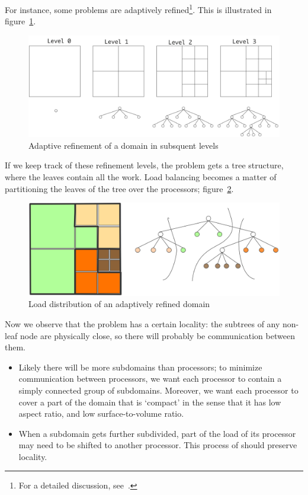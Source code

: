 For instance, some problems are adaptively
refined\footnote{For a detailed
  discussion, see~\cite{Campbell:octree}.}. This is illustrated in
figure~\ref{fig:octree1}.
\begin{figure}[ht]
  \includegraphics[scale=.14]{graphics/my_octree1}
  \caption{Adaptive refinement of a domain in subsquent levels}
  \label{fig:octree1}
\end{figure}
If we keep track of these refinement levels, the problem gets a tree
structure, where the leaves contain all the work.
Load balancing becomes a matter of partitioning the leaves of the
tree over the processors; figure~\ref{fig:octree2}.
\begin{figure}[ht]
  \includegraphics[scale=.18]{graphics/my_octree2}
  \caption{Load distribution of an adaptively refined domain}
  \label{fig:octree2}
\end{figure}
Now we observe that the problem has a certain locality: the subtrees
of any non-leaf node are physically close, so there will probably be
communication between them. 
\begin{itemize}
\item Likely there will be more subdomains than processors; to
  minimize communication between processors, we want each processor to
  contain a simply connected group of subdomains. Moreover, we want
  each processor to cover a part of the domain that is `compact' in
  the sense that it has low aspect ratio, and low surface-to-volume
  ratio.
\item When a subdomain gets further subdivided, part of the load of
  its processor may need to be shifted to another processor. This
  process of  should preserve
  locality.
\end{itemize}

